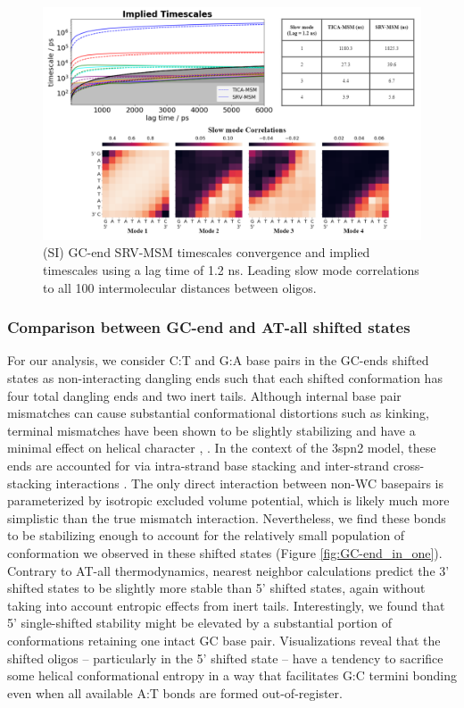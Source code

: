 \documentclass[journal=jpcbfk,manuscript=article]{achemso}
\begin{document}
\begin{figure}[ht!]
	\begin{center}
        \includegraphics[width=\textwidth]{Figs/figs_0804/GC-end_dynamic.png}
        \caption{(SI) GC-end SRV-MSM timescales convergence and implied timescales using a lag time of 1.2 ns. Leading slow mode correlations to all 100 intermolecular distances between oligos.}
        \label{fig:GC-end_dynamic}
	\end{center}
\end{figure}

\subsubsection{\label{sec:Results}Comparison between GC-end and AT-all shifted states}

For our analysis, we consider C:T and G:A base pairs in the GC-ends shifted states as non-interacting dangling ends such that each shifted conformation has four total dangling ends and two inert tails. Although internal base pair mismatches can cause substantial conformational distortions such as kinking, terminal mismatches have been shown to be slightly stabilizing and have a minimal effect on helical character \citep{Santalucia2004TM}, \citep{DiMichele2014EffectHybridization}. In the context of the 3spn2 model, these ends are accounted for via intra-strand base stacking and inter-strand cross-stacking interactions \citep{Hinckley2013AnHybridization}. The only direct interaction between non-WC basepairs is parameterized by isotropic excluded volume potential, which is likely much more simplistic than the true mismatch interaction. Nevertheless, we find these bonds to be stabilizing enough to account for the relatively small population of conformation we observed in these shifted states (Figure \ref{fig:GC-end_in_one}). Contrary to AT-all thermodynamics, nearest neighbor calculations predict the 3' shifted states to be slightly more stable than 5' shifted states, again without taking into account entropic effects from inert tails. Interestingly, we found that 5' single-shifted stability might be elevated by a substantial portion of conformations retaining one intact GC base pair. Visualizations reveal that the shifted oligos -- particularly in the 5' shifted state -- have a tendency to sacrifice some helical conformational entropy in a way that facilitates G:C termini bonding even when all available A:T bonds are formed out-of-register.
\end{document}
